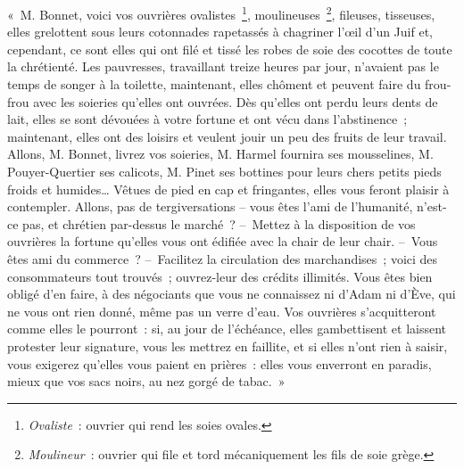 \documentclass[french,twoside]{book} %
\newenvironment{quoteblock}%
  {\begin{quoting}}
  {\end{quoting}}
\newenvironment{quotebar}{%
    \def\FrameCommand{{\color{rubric!10!}\vrule width 0.5em} \hspace{0.9em}}%
    \def\OuterFrameSep{\itemsep} %
    \MakeFramed {\advance\hsize-\width \FrameRestore}
  }%
  {%
    \endMakeFramed
  }
\renewenvironment{quoteblock}%
  {%
    \savenotes
    \setstretch{0.9}
    \normalfont
    \begin{quotebar}
  }
  {%
    \end{quotebar}
    \spewnotes
  }
\begin{document}
\begin{quoteblock}
\noindent « M. Bonnet, voici vos ouvrières ovalistes \footnote{\emph{Ovaliste} : ouvrier qui rend les soies ovales.}, moulineuses \footnote{\emph{Moulineur} : ouvrier qui file et tord mécaniquement les fils de soie grège.}, fileuses, tisseuses, elles grelottent sous leurs cotonnades rapetassés à chagriner l’œil d’un Juif et, cependant, ce sont elles qui ont filé et tissé les robes de soie des cocottes de toute la chrétienté. Les pauvresses, travaillant treize heures par jour, n’avaient pas le temps de songer à la toilette, maintenant, elles chôment et peuvent faire du frou-frou avec les soieries qu’elles ont ouvrées. Dès qu’elles ont perdu leurs dents de lait, elles se sont dévouées à votre fortune et ont vécu dans l’abstinence ; maintenant, elles ont des loisirs et veulent jouir un peu des fruits de leur travail. Allons, M. Bonnet, livrez vos soieries, M. Harmel fournira ses mousselines, M. Pouyer-Quertier ses calicots, M. Pinet ses bottines pour leurs chers petits pieds froids et humides… Vêtues de pied en cap et fringantes, elles vous feront plaisir à contempler. Allons, pas de tergiversations – vous êtes l’ami de l’humanité, n’est-ce pas, et chrétien par-dessus le marché ? – Mettez à la disposition de vos ouvrières la fortune qu’elles vous ont édifiée avec la chair de leur chair. – Vous êtes ami du commerce ? – Facilitez la circulation des marchandises ; voici des consommateurs tout trouvés ; ouvrez-leur des crédits illimités. Vous êtes bien obligé d’en faire, à des négociants que vous ne connaissez ni d’Adam ni d’Ève, qui ne vous ont rien donné, même pas un verre d’eau. Vos ouvrières s’acquitteront comme elles le pourront : si, au jour de l’échéance, elles gambettisent et laissent protester leur signature, vous les mettrez en faillite, et si elles n’ont rien à saisir, vous exigerez qu’elles vous paient en prières : elles vous enverront en paradis, mieux que vos sacs noirs, au nez gorgé de tabac. »\end{quoteblock}
\end{document}
